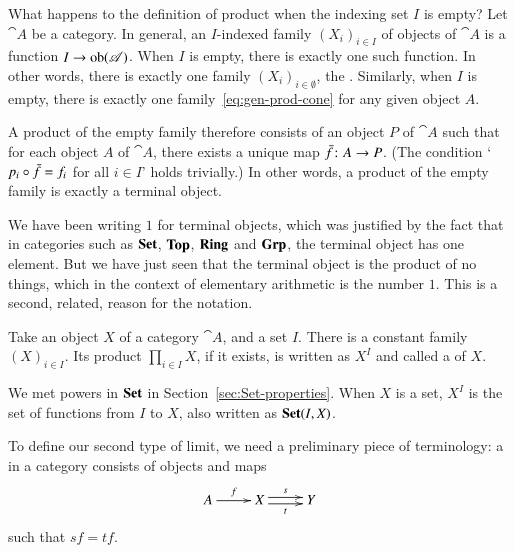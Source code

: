 \begin{example}
\label{eg:arb-prods-terminal}
What happens to the definition of product when the indexing set $I$ is
empty?%
%
%
Let $\cat{A}$ be a category.  In general, an $I$-indexed family
$(X_i)_{i \in I}$ of objects of $\cat{A}$ is a function $I \to
\operatorname{ob}(\mathscr{A})$.  When $I$ is empty, there is exactly one such function.  In
other words, there is exactly one family $(X_i)_{i \in \emptyset}$, the
.  Similarly, when $I$ is empty, there is exactly one
family~\eqref{eq:gen-prod-cone} for any given object $A$.

A product of the empty family therefore consists of an object $P$ of $\cat{A}$
such that for each object $A$ of $\cat{A}$, there exists a unique map
$\bar{f}\from A \to P$.  (The condition `$p_i \mathbin{\circ} \bar{f} = f_i$ for all $i
\in I$' holds trivially.)  In other words, a product of the empty family is
exactly a terminal%
%
%
object.

We have been writing $1$%
%
%
for terminal objects, which was justified by the fact that in categories
such as $\mathbf{Set}$, $\mathbf{Top}$, $\mathbf{Ring}$ and $\mathbf{Grp}$, the terminal object has one%
%
%
element.  But we have just seen that the terminal object is the product of
no things, which in the context of elementary arithmetic%
%
% 
is the number $1$.  This is a second, related, reason for the notation.
\end{example}

\begin{example}
Take an object $X$ of a category $\cat{A}$, and a set $I$.  There is a
constant family $(X)_{i \in I}$.  Its product $\prod_{i \in I} X$, if it
exists, is written as $X^I$%
%
%
and called a %
%
%
of $X$.  

We met powers in $\mathbf{Set}$ in Section~\ref{sec:Set-properties}.  When $X$ is a
set, $X^I$ is the set of functions from $I$ to $X$, also written as
$\mathbf{Set}(I, X)$.
\end{example}




To define our second type of limit, we need a preliminary piece of
terminology: a %
%
%
in a category consists of objects and maps
% 
\begin{equation}        
\label{eq:fork}
\xymatrix{
A \ar[r]^f   &
X \ar@<.5ex>[r]^s \ar@<-.5ex>[r]_t    &
Y
}
\end{equation}
% 
such that $sf = tf$.

